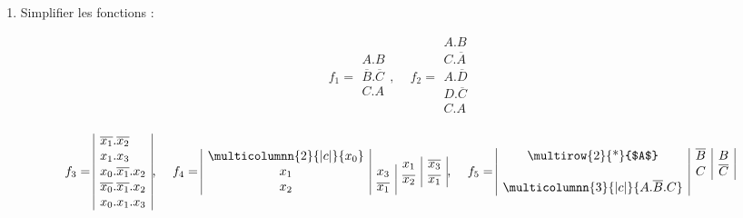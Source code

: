 \begin{enumerate} [label=\arabic*$^\circ$]
\item Simplifier les fonctions :



\[ f_1 = 
\begin{array}{|c|}       
	A . B  \\
	\overline{B} . \overline{C} \\
	C . A \\
\end{array} \text{, } 
    \quad f_2 = \begin{array}{|c|} 
    					A . B \\
    					C . \overline{A} \\
    					A . \overline{D} \\
    					D . \overline{C} \\
    					C . A \\
                \end{array}  
\]



\[ f_3 = 
\begin{array}{|l|} 
	 \overline{x_1} . \overline{x_2} \\
	 x_1 . x_3 \\
	 x_0 . \overline{x_1} . x_2 \\
	 \overline{x_0 } . \overline{x_1} . x_2 \\
	 x_0 . x_1 . x_3 \\
\end{array}\text{, } \quad f_4 = \begin{array}{|c|c|} 
\multicolumnn{2}{|c|}{x_0} \\
								x_1 & x_3 \\
								x_2 & \overline{x_1} \\
							\end{array} \begin{array}{c|c|}
											x_1 & \overline{x_3} \\
											\overline{x_2} & \overline{x_1} \\
										 \end{array} \text{, } \quad f_5 = \begin{array}{|c|c|c|} 
										 							  $\multirow{2}{*}{$A$}$ & \overline{B} & B \\
										 							   						& C & \overline{C} \\
\multicolumnn{3}{|c|}{A . \overline{B} . C } 	
										 							\end{array} 
\]




\end{enumerate}
